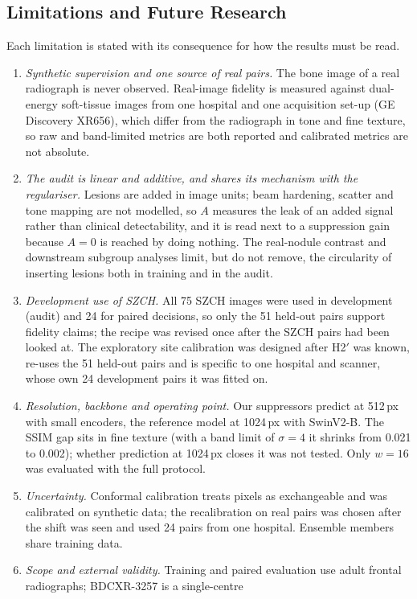\subsection{Limitations and Future Research}
\label{sec:limitations}
Each limitation is stated with its consequence for how the results must be read.
\begin{enumerate}
\item \emph{Synthetic supervision and one source of real pairs.} The bone image of a real radiograph is never observed. Real-image fidelity
 is measured against dual-energy soft-tissue images from one hospital and one acquisition set-up (GE Discovery XR656), which differ from
 the radiograph in tone and fine texture, so raw and band-limited metrics are both reported and calibrated metrics are not absolute.
\item \emph{The audit is linear and additive, and shares its mechanism with the regulariser.} Lesions are added in image units; beam
 hardening, scatter and tone mapping are not modelled, so $A$ measures the leak of an added signal rather than clinical detectability, and
 it is read next to a suppression gain because $A=0$ is reached by doing nothing. The real-nodule contrast and downstream subgroup analyses
 limit, but do not remove, the circularity of inserting lesions both in training and in the audit.
\item \emph{Development use of SZCH.} All 75 SZCH images were used in development (audit) and 24 for paired decisions, so only the 51
 held-out pairs support fidelity claims; the recipe was revised once after the SZCH pairs had been looked at. The exploratory site
 calibration was designed after H2$'$ was known, re-uses the 51 held-out pairs and is specific to one hospital and scanner, whose own 24
 development pairs it was fitted on.
\item \emph{Resolution, backbone and operating point.} Our suppressors predict at 512\,px with small encoders, the reference model at
 1024\,px with SwinV2-B. The SSIM gap sits in fine texture (with a band limit of $\sigma=4$ it shrinks from 0.021 to 0.002); whether
 prediction at 1024\,px closes it was not tested. Only $w=16$ was evaluated with the full protocol.
\item \emph{Uncertainty.} Conformal calibration treats pixels as exchangeable and was calibrated on synthetic data; the recalibration on
 real pairs was chosen after the shift was seen and used 24 pairs from one hospital. Ensemble members share training data.
\item \emph{Scope and external validity.} Training and paired evaluation use adult frontal radiographs; BDCXR-3257 is a single-centre

\end{enumerate}
